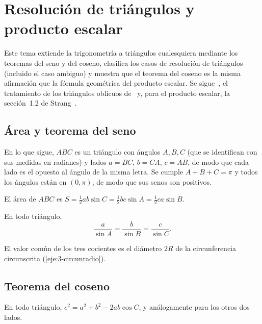 \chapter{Resolución de triángulos y producto escalar}
\label{tema:3}

Este tema extiende la trigonometría a triángulos cualesquiera mediante los teoremas del seno y del coseno, clasifica los casos de resolución de triángulos (incluido el caso ambiguo) y muestra que el teorema del coseno es la misma afirmación que la fórmula geométrica del producto escalar. Se sigue~\cite[§10.1, §10.2 y §10.8]{osat}, el tratamiento de los triángulos oblicuos de~\cite{stewart} y, para el producto escalar, la sección~1.2 de Strang~\cite{strang}.

\section{Área y teorema del seno}

En lo que sigue, $ABC$ es un triángulo con ángulos $A,B,C$ (que se identifican con sus medidas en radianes) y lados $a=BC$, $b=CA$, $c=AB$, de modo que cada lado es el opuesto al ángulo de la misma letra. Se cumple $A+B+C=\pi$ y todos los ángulos están en $(0,\pi)$, de modo que sus senos son positivos.

\begin{proposicion}[Área]\label{prop:area}
El área de $ABC$ es $S=\tfrac12 ab\sin C=\tfrac12 bc\sin A=\tfrac12 ca\sin B$.
\end{proposicion}

\begin{teorema}\label{teo:seno}
En todo triángulo,
\[
\frac{a}{\sin A}=\frac{b}{\sin B}=\frac{c}{\sin C}.
\]
\end{teorema}

El valor común de los tres cocientes es el diámetro $2R$ de la circunferencia circunscrita (\cref{eje:3-circunradio}).

\section{Teorema del coseno}

\begin{teorema}\label{teo:coseno}
En todo triángulo, $c^{2}=a^{2}+b^{2}-2ab\cos C$, y análogamente para los otros dos lados.
\end{teorema}

